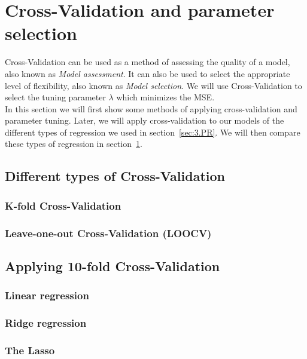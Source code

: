 \section{Cross-Validation and parameter selection} \label{sec:4.CV&PS}

Cross-Validation can be used as a method of assessing the quality of a model, also known as \textit{Model assessment}. It can also be used to select the appropriate level of flexibility, also known as \textit{Model selection}. We will use Cross-Validation to select the tuning parameter $\lambda$ which minimizes the MSE. \\

In this section we will first show some methods of applying cross-validation and parameter tuning. Later, we will apply cross-validation to our models of the different types of regression we used in section~\ref{sec:3.PR}. We will then compare these types of regression in section~\ref{sec:4.CV&PS}. 


\subsection{Different types of Cross-Validation}


\subsubsection{K-fold Cross-Validation}


\subsubsection{Leave-one-out Cross-Validation (LOOCV)}


\subsection{Applying 10-fold Cross-Validation}


\subsubsection{Linear regression}


\subsubsection{Ridge regression}


\subsubsection{The Lasso}